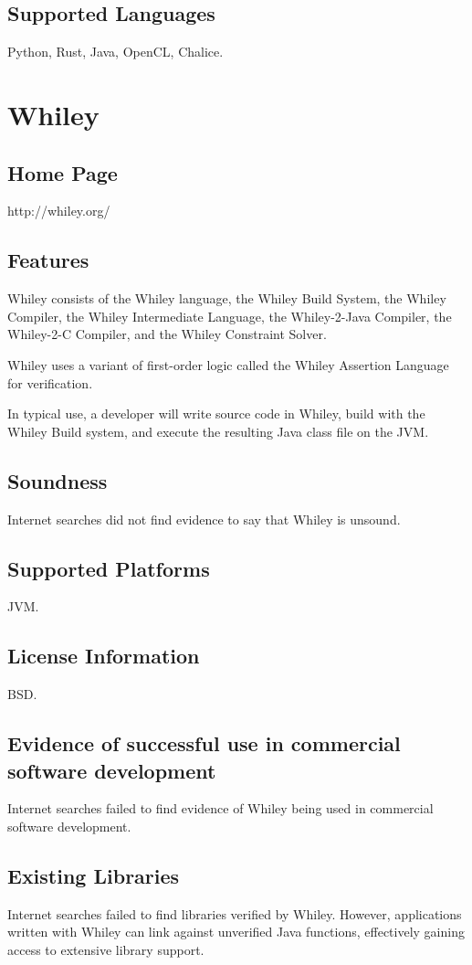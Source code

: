 \documentclass[12pt,openany,a4paper]{book}
\begin{document}
	\subsection{Supported Languages}
	Python, Rust, Java, OpenCL, Chalice.





\section{Whiley}
	\subsection{Home Page}
	http://whiley.org/
	
	\subsection{Features}
	Whiley consists of the Whiley language, the Whiley Build System, the Whiley Compiler, the Whiley Intermediate Language, the Whiley-2-Java Compiler, the Whiley-2-C Compiler, and the Whiley Constraint Solver\cite{10.1007/978-3-319-02654-1_13}. 
	
	Whiley uses a variant of first-order logic called the Whiley Assertion Language for verification.
	
	In typical use, a developer will write source code in Whiley, build with the Whiley Build system, and execute the resulting Java class file on the JVM.  

	\subsection{Soundness}
	Internet searches did not find evidence to say that Whiley is unsound.
	\subsection{Supported Platforms}
	JVM.
	\subsection{License Information}
	BSD.
	\subsection{Evidence of successful use in commercial software development}
		Internet searches failed to find evidence of Whiley being used in commercial software development.
	\subsection{Existing Libraries}
		Internet searches failed to find libraries verified by Whiley. However, applications written with Whiley can link against unverified Java functions, effectively gaining access to extensive library support.
\end{document}
